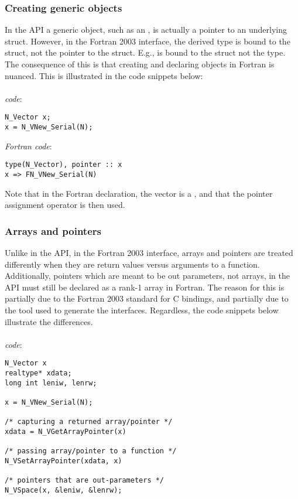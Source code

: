 \subsubsection{Creating generic {\sundials} objects}

In the {\CC} API a generic {\sundials} object, such as an , is actually
a pointer to an underlying {\CC} struct. However, in the Fortran 2003 interface,
the derived type is bound to the {\CC} struct, not the pointer to the struct. E.g.,
 is bound to the {\CC} struct  not the
 type. The consequence of this is that creating and declaring {\sundials}
objects in Fortran is nuanced. This is illustrated in the code snippets below:
\\
\\
\noindent \emph{{\CC} code}:
\begin{verbatim}
N_Vector x;
x = N_VNew_Serial(N);
\end{verbatim}

\noindent \emph{Fortran code}:
\begin{verbatim}
type(N_Vector), pointer :: x
x => FN_VNew_Serial(N)
\end{verbatim}

Note that in the Fortran declaration, the vector is a , and
that the pointer assignment operator is then used.

\subsubsection{Arrays and pointers}

Unlike in the {\CC} API, in the Fortran 2003 interface, arrays and pointers are
treated differently when they are return values versus arguments to a function.
Additionally, pointers which are meant to be out parameters, not arrays,
in the {\CC} API must still be declared as a rank-1 array in Fortran.
The reason for this is partially due to the Fortran 2003 standard for C bindings,
and partially due to the tool used to generate the interfaces. Regardless, the
code snippets below illustrate the differences.
\\
\\
\noindent \emph{{\CC} code}:
\begin{verbatim}
N_Vector x
realtype* xdata;
long int leniw, lenrw;

x = N_VNew_Serial(N);

/* capturing a returned array/pointer */
xdata = N_VGetArrayPointer(x)

/* passing array/pointer to a function */
N_VSetArrayPointer(xdata, x)

/* pointers that are out-parameters */
N_VSpace(x, &leniw, &lenrw);
\end{verbatim}

